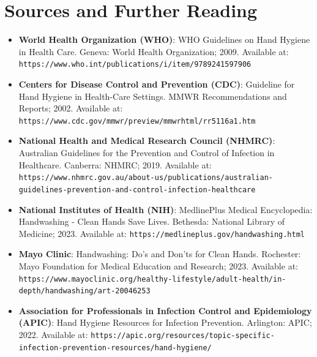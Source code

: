 \section*{Sources and Further Reading}
\begin{itemize}
    \item \textbf{World Health Organization (WHO)}: WHO Guidelines on Hand Hygiene in Health Care. Geneva: World Health Organization; 2009. Available at: \texttt{https://www.who.int/publications/i/item/9789241597906}
    \item \textbf{Centers for Disease Control and Prevention (CDC)}: Guideline for Hand Hygiene in Health-Care Settings. MMWR Recommendations and Reports; 2002. Available at: \texttt{https://www.cdc.gov/mmwr/preview/mmwrhtml/rr5116a1.htm}
    \item \textbf{National Health and Medical Research Council (NHMRC)}: Australian Guidelines for the Prevention and Control of Infection in Healthcare. Canberra: NHMRC; 2019. Available at: \texttt{https://www.nhmrc.gov.au/about-us/publications/australian-guidelines-prevention-and-control-infection-healthcare}
    \item \textbf{National Institutes of Health (NIH)}: MedlinePlus Medical Encyclopedia: Handwashing - Clean Hands Save Lives. Bethesda: National Library of Medicine; 2023. Available at: \texttt{https://medlineplus.gov/handwashing.html}
    \item \textbf{Mayo Clinic}: Handwashing: Do's and Don'ts for Clean Hands. Rochester: Mayo Foundation for Medical Education and Research; 2023. Available at: \texttt{https://www.mayoclinic.org/healthy-lifestyle/adult-health/in-depth/handwashing/art-20046253}
    \item \textbf{Association for Professionals in Infection Control and Epidemiology (APIC)}: Hand Hygiene Resources for Infection Prevention. Arlington: APIC; 2022. Available at: \texttt{https://apic.org/resources/topic-specific-infection-prevention-resources/hand-hygiene/}
\end{itemize}